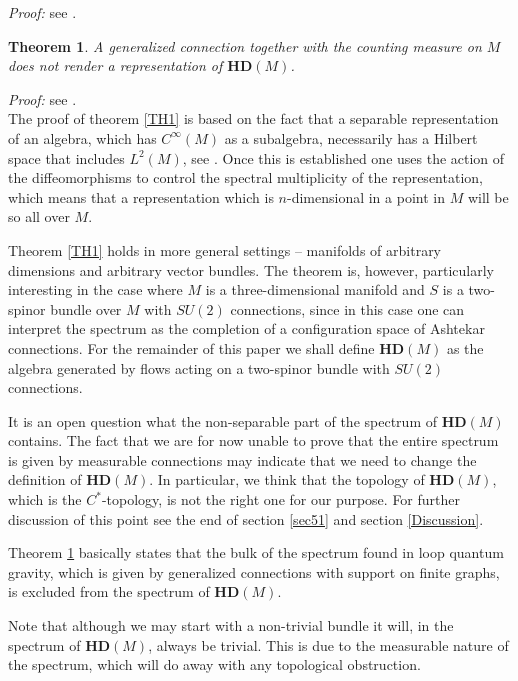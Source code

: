 \documentclass[12pt]{article}
\newtheorem{thm}{Theorem}[subsection]
\begin{document}
{\it Proof:} see \cite{AGnew}.\\

\begin{thm}
\label{TH2}
A generalized connection together with the counting measure on $M$ does not render a representation of $\mathbf{HD}(M) $.
\end{thm}

{\it Proof:} see \cite{AGnew}.\\



The proof of theorem \ref{TH1} is based on the fact that a separable representation of an algebra, which has $C^\infty(M)$ as a subalgebra, necessarily has a Hilbert space that includes $L^2(M)$, see \cite{Kadison}. Once this is established one uses the action of the diffeomorphisms to control the spectral multiplicity of the representation, which means that a representation which is $n$-dimensional in a point in $M$ will  be so all over $M$.



Theorem \ref{TH1} holds in more general settings -- manifolds of arbitrary dimensions and arbitrary vector bundles. The theorem is, however, particularly interesting in the case where $M$ is a three-dimensional manifold and $S$ is a two-spinor  bundle over $M$ with $SU(2)$ connections, since in this case one can interpret the spectrum as the completion of a configuration space of Ashtekar connections. 
For the remainder of this paper we shall define $\mathbf{HD}(M) $ as the algebra generated by flows acting on a two-spinor bundle with $SU(2)$ connections. 


It is an open question what the non-separable part of the spectrum of $\mathbf{HD}(M) $ contains. The fact that we are for now unable to prove that the entire spectrum is given by measurable connections may indicate that we need to change the definition of $\mathbf{HD}(M) $. In particular, we think that the topology of $\mathbf{HD}(M) $, which is the $C^*$-topology, is not the right one for our purpose. For further discussion of this point see the end of section \ref{sec51} and section \ref{Discussion}.




Theorem \ref{TH2} basically states that the bulk of the spectrum found in loop quantum gravity, which is given by generalized connections with support on finite graphs, is excluded from the spectrum of $\mathbf{HD}(M) $.



Note that although we may start with a non-trivial bundle it will, in the spectrum of $\mathbf{HD}(M) $, always be trivial. This is due to the measurable nature of the spectrum, which will do away with any topological obstruction.
\end{document}
